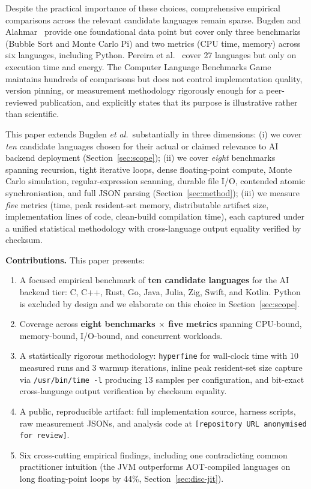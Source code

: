 \documentclass[10pt,conference]{IEEEtran}
\begin{document}
Despite the practical importance of these choices, comprehensive
empirical comparisons across the relevant candidate languages remain
sparse. Bugden and Alahmar~\cite{bugden2022igscong,bugden2022safety}
provide one foundational data point but cover only three benchmarks
(Bubble Sort and Monte Carlo Pi) and two metrics (CPU time, memory)
across six languages, including Python. Pereira et
al.~\cite{pereira2017energy} cover 27 languages but only on execution
time and energy. The Computer Language Benchmarks Game~\cite{clbg}
maintains hundreds of comparisons but does not control implementation
quality, version pinning, or measurement methodology rigorously enough
for a peer-reviewed publication, and explicitly states that its
purpose is illustrative rather than scientific.

This paper extends Bugden \emph{et al.}\ substantially in three
dimensions: (i) we cover \emph{ten} candidate languages chosen for
their actual or claimed relevance to AI backend deployment
(Section~\ref{sec:scope}); (ii) we cover \emph{eight} benchmarks
spanning recursion, tight iterative loops, dense floating-point
compute, Monte Carlo simulation, regular-expression scanning, durable
file I/O, contended atomic synchronisation, and full JSON parsing
(Section~\ref{sec:method}); (iii) we measure \emph{five} metrics
(time, peak resident-set memory, distributable artifact size,
implementation lines of code, clean-build compilation time), each
captured under a unified statistical methodology with cross-language
output equality verified by checksum.

\textbf{Contributions.} This paper presents:
\begin{enumerate}
    \item A focused empirical benchmark of \textbf{ten candidate
          languages} for the AI backend tier: C, C++, Rust, Go, Java,
          Julia, Zig, Swift, and Kotlin. Python is excluded by design
          and we elaborate on this choice in Section~\ref{sec:scope}.
    \item Coverage across \textbf{eight benchmarks $\times$ five
          metrics} spanning CPU-bound, memory-bound, I/O-bound, and
          concurrent workloads.
    \item A statistically rigorous methodology: \texttt{hyperfine} for
          wall-clock time with 10 measured runs and 3 warmup
          iterations, inline peak resident-set size capture via
          \texttt{/usr/bin/time -l} producing 13 samples per
          configuration, and bit-exact cross-language output
          verification by checksum equality.
    \item A public, reproducible artifact: full implementation source,
          harness scripts, raw measurement JSONs, and analysis code at
          \texttt{[repository URL anonymised for review]}.
    \item Six cross-cutting empirical findings, including one
          contradicting common practitioner intuition (the JVM
          outperforms AOT-compiled languages on long
          floating-point loops by 44\%, Section~\ref{sec:disc-jit}).
\end{enumerate}
\end{document}
